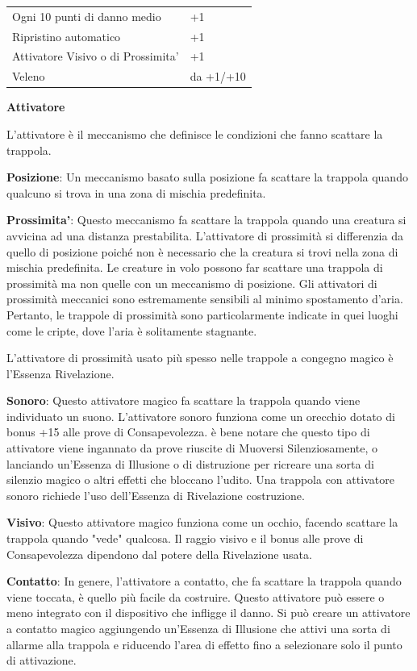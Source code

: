 \documentclass[a4paper,11pt,twoside,openany]{book}
\begin{document}
{\begin{tabular}{ll}
Ogni 10 punti di danno medio &+1\\
Ripristino automatico &+1\\
Attivatore Visivo o di Prossimita’ &+1\\
Veleno &da +1/+10\\

\end{tabular}

\bigskip

\textbf{Attivatore}

L'attivatore è il meccanismo che definisce le condizioni che fanno scattare la trappola.

\textbf{Posizione}: Un meccanismo basato sulla posizione fa scattare la trappola quando qualcuno si trova in una zona di mischia predefinita.

\textbf{Prossimita'}: Questo meccanismo fa scattare la trappola quando una creatura si avvicina ad una distanza prestabilita. L'attivatore di prossimità si differenzia da quello di posizione poiché non è necessario che la creatura si trovi nella zona di mischia predefinita. Le creature in volo possono far scattare una trappola di prossimità ma non quelle con un meccanismo di posizione. Gli attivatori di prossimità meccanici sono estremamente sensibili al minimo spostamento d'aria. Pertanto, le trappole di prossimità sono particolarmente indicate in quei luoghi come le cripte, dove l'aria è solitamente stagnante.

L'attivatore di prossimità usato più spesso nelle trappole a congegno magico è l'Essenza Rivelazione.

\textbf{Sonoro}: Questo attivatore magico fa scattare la trappola quando viene individuato un suono. L'attivatore sonoro funziona come un orecchio dotato di bonus +15 alle prove di Consapevolezza. è bene notare che questo tipo di attivatore viene ingannato da prove riuscite di Muoversi Silenziosamente, o lanciando un'Essenza di Illusione o di distruzione per ricreare una sorta di silenzio magico o altri effetti che bloccano l'udito. Una trappola con attivatore sonoro richiede l'uso dell'Essenza di Rivelazione costruzione.

\textbf{Visivo}: Questo attivatore magico funziona come un occhio, facendo scattare la trappola quando "vede" qualcosa. Il raggio visivo e il bonus alle prove di Consapevolezza dipendono dal potere della Rivelazione usata.

\textbf{Contatto}: In genere, l'attivatore a contatto, che fa scattare la trappola quando viene toccata, è quello più facile da costruire. Questo attivatore può essere o meno integrato con il dispositivo che infligge il danno. Si può creare un attivatore a contatto magico aggiungendo un'Essenza di Illusione che attivi una sorta di allarme alla trappola e riducendo l'area di effetto fino a selezionare solo il punto di attivazione.

}
\end{document}
